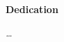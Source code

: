 \vglue 6cm 
\begin{center}
\textbf{Dedication}
\end{center}
\vglue 2cm 

\begin{center}
\emph{\dots}
\end{center}



